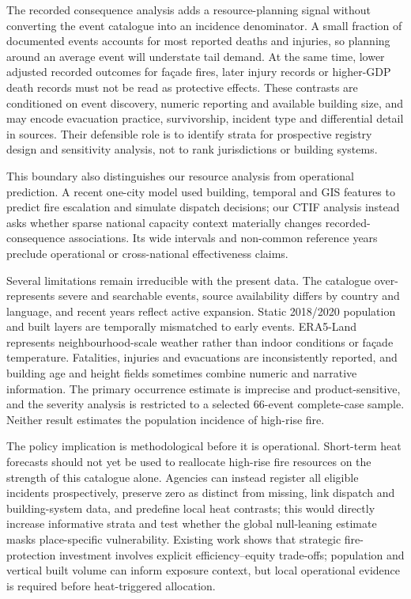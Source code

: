 \documentclass[11pt]{article}
\begin{document}
The recorded consequence analysis adds a resource-planning signal without converting the event catalogue into an incidence denominator. A small fraction of documented events accounts for most reported deaths and injuries, so planning around an average event will understate tail demand. At the same time, lower adjusted recorded outcomes for façade fires, later injury records or higher-GDP death records must not be read as protective effects. These contrasts are conditioned on event discovery, numeric reporting and available building size, and may encode evacuation practice, survivorship, incident type and differential detail in sources. Their defensible role is to identify strata for prospective registry design and sensitivity analysis, not to rank jurisdictions or building systems.

This boundary also distinguishes our resource analysis from operational prediction. A recent one-city model used building, temporal and GIS features to predict fire escalation and simulate dispatch decisions\citep{Lee2025}; our CTIF analysis instead asks whether sparse national capacity context materially changes recorded-consequence associations. Its wide intervals and non-common reference years preclude operational or cross-national effectiveness claims.

Several limitations remain irreducible with the present data. The catalogue over-represents severe and searchable events, source availability differs by country and language, and recent years reflect active expansion. Static 2018/2020 population and built layers are temporally mismatched to early events. ERA5-Land represents neighbourhood-scale weather rather than indoor conditions or façade temperature. Fatalities, injuries and evacuations are inconsistently reported, and building age and height fields sometimes combine numeric and narrative information. The primary occurrence estimate is imprecise and product-sensitive, and the severity analysis is restricted to a selected 66-event complete-case sample. Neither result estimates the population incidence of high-rise fire.

The policy implication is methodological before it is operational. Short-term heat forecasts should not yet be used to reallocate high-rise fire resources on the strength of this catalogue alone. Agencies can instead register all eligible incidents prospectively, preserve zero as distinct from missing, link dispatch and building-system data, and predefine local heat contrasts; this would directly increase informative strata and test whether the global null-leaning estimate masks place-specific vulnerability. Existing work shows that strategic fire-protection investment involves explicit efficiency--equity trade-offs\citep{Behrendt2019}; population and vertical built volume can inform exposure context, but local operational evidence is required before heat-triggered allocation.
\end{document}
